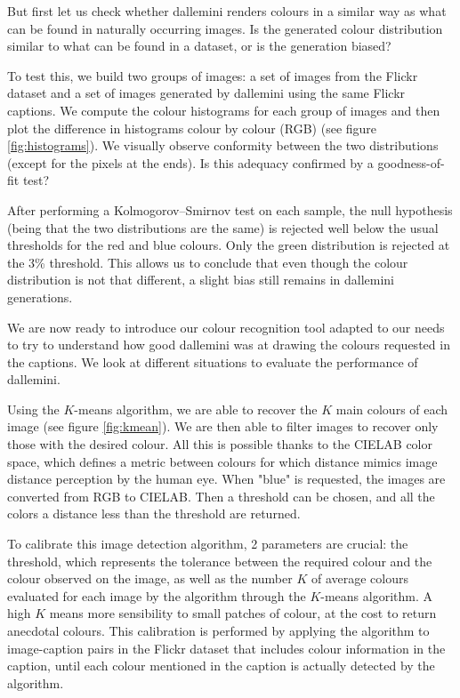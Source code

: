 \documentclass{article}
\begin{document}
\begin{multicols}{2}
But first let us check whether \gls{dallemini} renders colours in a similar way as what can be found in naturally occurring images.  Is the generated colour distribution similar to what can be found in a dataset, or is the generation biased?

To test this, we build two groups of images: a set of images from the Flickr dataset and a set of images generated by \gls{dallemini} using the same Flickr captions. We compute the colour histograms for each group of images and then plot the difference in histograms colour by colour (RGB) (see figure \ref{fig:histograms}). We visually observe conformity between the two distributions (except for the pixels at the ends). Is this adequacy confirmed by a goodness-of-fit test?

After performing a Kolmogorov–Smirnov test on each sample, the null hypothesis (being that the two distributions are the same) is rejected well below the usual thresholds for the red and blue colours. Only the green distribution is rejected at the 3\% threshold. This allows us to conclude that even though the colour distribution is not that different, a slight bias still remains in \gls{dallemini} generations.

We are now ready to introduce our colour recognition tool adapted to our needs to try to understand how good \gls{dallemini} was at drawing the colours requested in the captions. We look at different situations to evaluate the performance of \gls{dallemini}. %

Using the $K$-means algorithm, we are able to recover the $K$ main colours of each image (see figure \ref{fig:kmean}). We are then able to filter images to recover only those with the desired colour. All this is possible thanks to the CIELAB color space, which defines a metric between colours for which distance mimics image distance perception by the human eye. When "blue" is requested, the images are converted from RGB to CIELAB. Then a threshold can be chosen, and all the colors a distance less than the threshold are returned.

To calibrate this image detection algorithm, 2 parameters are crucial: the threshold, which represents the tolerance between the required colour and the colour observed on the image, as well as the number $K$ of average colours evaluated for each image by the algorithm through the $K$-means algorithm. A high $K$ means more sensibility to small patches of colour, at the cost to return anecdotal colours. This calibration is performed by applying the algorithm to image-caption pairs in the Flickr dataset that includes colour information in the caption, until each colour mentioned in the caption is actually detected by the algorithm.


\end{multicols}
\end{document}
